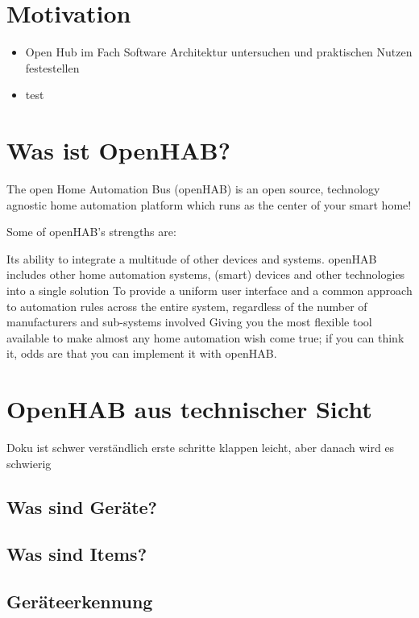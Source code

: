 \section{Motivation}
\begin{itemize}
	\item Open Hub im Fach Software Architektur untersuchen und praktischen Nutzen festestellen
	\item test
\end{itemize}

\section{Was ist OpenHAB?}
The open Home Automation Bus (openHAB) is an open source, technology agnostic home automation platform which runs as the center of your smart home!

Some of openHAB's strengths are:

Its ability to integrate a multitude of other devices and systems. openHAB includes other home automation systems, (smart) devices and other technologies into a single solution
To provide a uniform user interface and a common approach to automation rules across the entire system, regardless of the number of manufacturers and sub-systems involved
Giving you the most flexible tool available to make almost any home automation wish come true; if you can think it, odds are that you can implement it with openHAB.

\section{OpenHAB aus technischer Sicht}

Doku ist schwer verständlich
erste schritte klappen leicht, aber danach wird es schwierig

\subsection{Was sind Geräte?}

\subsection{Was sind Items?}

\subsection{Geräteerkennung}

